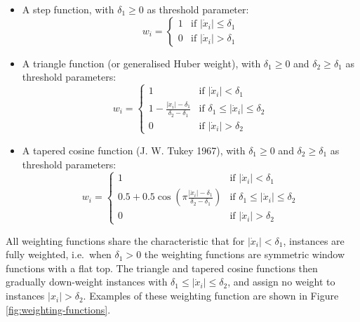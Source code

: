 \documentclass[
  a4paper,
]{article}
\begin{document}
\begin{itemize}
\item
  A step function, with \(\delta_1 \geq 0\) as threshold parameter:
  \begin{equation*}
  w_i =
  \begin{cases}
  1 & \text{if } \left| \dot{x}_i \right| \leq \delta_1\\
  0 & \text{if } \left| \dot{x}_i \right| > \delta_1
  \end{cases}
  \end{equation*}
\item
  A triangle function (or generalised Huber weight), with
  \(\delta_1 \geq 0\) and \(\delta_2 \geq \delta_1\) as threshold
  parameters: \begin{equation*}
  w_i =
  \begin{cases}
  1 & \text{if } \left| \dot{x}_i \right| < \delta_1\\
  1 - \frac{\left| \dot{x}_i \right| - \delta_1}{\delta_2 - \delta_1} & \text{if } \delta_1 \leq \left| \dot{x}_i \right| \leq \delta_2 \\
  0 & \text{if } \left| \dot{x}_i \right| > \delta_2
  \end{cases}
  \end{equation*}
\item
  A tapered cosine function (J. W. Tukey 1967), with \(\delta_1 \geq 0\)
  and \(\delta_2 \geq \delta_1\) as threshold parameters:
  \begin{equation*}
  w_i =
  \begin{cases}
  1 & \text{if } \left| \dot{x}_i \right| < \delta_1\\
  0.5 + 0.5 \cos\left(\pi \frac{\left| \dot{x}_i \right| - \delta_1}{\delta_2 - \delta_1} \right) & \text{if } \delta_1 \leq \left| \dot{x}_i \right| \leq \delta_2 \\
  0 & \text{if } \left| \dot{x}_i \right| > \delta_2
  \end{cases}
  \end{equation*}
\end{itemize}

All weighting functions share the characteristic that for
\(\left| \dot{x}_i \right|< \delta_1\), instances are fully weighted,
i.e.~when \(\delta_1 > 0\) the weighting functions are symmetric window
functions with a flat top. The triangle and tapered cosine functions
then gradually down-weight instances with
\(\delta_1 \leq \left| \dot{x}_i \right| \leq \delta_2\), and assign no
weight to instances \(\left| x_i \right| > \delta_2\). Examples of these
weighting function are shown in Figure \ref{fig:weighting-functions}.
\end{document}
